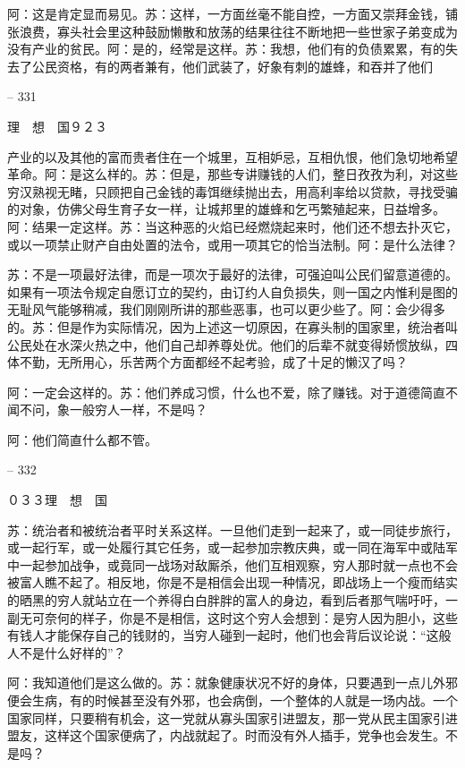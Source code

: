 \documentclass[11pt,oneside]{book}
\begin{document}
\begin{common-format}
    阿：这是肯定显而易见。苏：这样，一方面丝毫不能自控，一方面又崇拜金钱，铺张浪费，寡头社会里这种鼓励懒散和放荡的结果往往不断地把一些世家子弟变成为没有产业的贫民。阿：是的，经常是这样。苏：我想，他们有的负债累累，有的失去了公民资格，有的两者兼有，他们武装了，好象有刺的雄蜂，和吞并了他们

    

-- 331

    理　想　国９２３

    产业的以及其他的富而贵者住在一个城里，互相妒忌，互相仇恨，他们急切地希望革命。阿：是这么样的。苏：但是，那些专讲赚钱的人们，整日孜孜为利，对这些穷汉熟视无睹，只顾把自己金钱的毒饵继续抛出去，用高利率给以贷款，寻找受骗的对象，仿佛父母生育子女一样，让城邦里的雄蜂和乞丐繁殖起来，日益增多。阿：结果一定这样。苏：当这种恶的火焰已经燃烧起来时，他们还不想去扑灭它，或以一项禁止财产自由处置的法令，或用一项其它的恰当法制。阿：是什么法律？

    苏：不是一项最好法律，而是一项次于最好的法律，可强迫叫公民们留意道德的。如果有一项法令规定自愿订立的契约，由订约人自负损失，则一国之内惟利是图的无耻风气能够稍减，我们刚刚所讲的那些恶事，也可以更少些了。阿：会少得多的。苏：但是作为实际情况，因为上述这一切原因，在寡头制的国家里，统治者叫公民处在水深火热之中，他们自己却养尊处优。他们的后辈不就变得娇惯放纵，四体不勤，无所用心，乐苦两个方面都经不起考验，成了十足的懒汉了吗？

    阿：一定会这样的。苏：他们养成习惯，什么也不爱，除了赚钱。对于道德简直不闻不问，象一般穷人一样，不是吗？

    阿：他们简直什么都不管。

    

-- 332

    ０３３理　想　国

    苏：统治者和被统治者平时关系这样。一旦他们走到一起来了，或一同徒步旅行，或一起行军，或一处履行其它任务，或一起参加宗教庆典，或一同在海军中或陆军中一起参加战争，或竟同一战场对敌厮杀，他们互相观察，穷人那时就一点也不会被富人瞧不起了。相反地，你是不是相信会出现一种情况，即战场上一个瘦而结实的晒黑的穷人就站立在一个养得白白胖胖的富人的身边，看到后者那气喘吁吁，一副无可奈何的样子，你是不是相信，这时这个穷人会想到：是穷人因为胆小，这些有钱人才能保存自己的钱财的，当穷人碰到一起时，他们也会背后议论说：“这般人不是什么好样的”？

    阿：我知道他们是这么做的。苏：就象健康状况不好的身体，只要遇到一点儿外邪便会生病，有的时候甚至没有外邪，也会病倒，一个整体的人就是一场内战。一个国家同样，只要稍有机会，这一党就从寡头国家引进盟友，那一党从民主国家引进盟友，这样这个国家便病了，内战就起了。时而没有外人插手，党争也会发生。不是吗？


\end{common-format}
\end{document}
